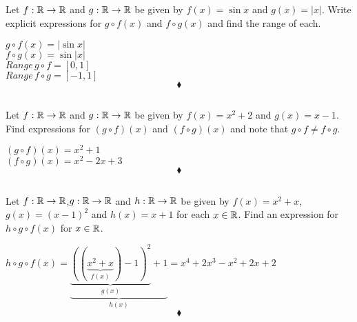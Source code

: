\subsection{}
\begin{tcolorbox}
Let $f:\mathbb{R}\rightarrow\mathbb{R}$ and $g:\mathbb{R}\rightarrow\mathbb{R}$ be given by $f(x)=\sin{x}$ and $g(x)= |x|$. Write explicit expressions for $g\circ f(x)$ and $f\circ g(x)$ and find the range of each.
\end{tcolorbox}
$$ $$ 
$g\circ f(x)= |\sin{x}|$\\
$f\circ g(x)= \sin{|x|}$\\
$Range \,g\circ f= [0,1]$\\
$Range \,f\circ g=[-1,1]$
$$\blacklozenge$$

\subsection{}
\begin{tcolorbox}
Let $f:\mathbb{R}\rightarrow\mathbb{R}$ and $g:\mathbb{R}\rightarrow\mathbb{R}$ be given by $f(x)=x^2+2$ and $g(x)= x-1$. Find expressions for $(g\circ f)(x)$ and $(f\circ g)(x)$ and note that $g\circ f\ne f\circ g$.
\end{tcolorbox}
$$ $$ 
$(g\circ f)(x)=x^2+1$\\
$(f\circ g)(x)= x^2-2x+3$\\
$$\blacklozenge$$
\newpage

\subsection{}
\begin{tcolorbox}
Let $f:\mathbb{R}\rightarrow\mathbb{R}$,$g:\mathbb{R}\rightarrow\mathbb{R}$  and $h:\mathbb{R}\rightarrow\mathbb{R}$ be given by $f(x)=x^2+x$, $g(x)=(x-1)^2$  and $h(x)= x+1$ for each $x\in\mathbb{R}$. Find an expression for $h\circ g\circ f(x)$ for $x\in\mathbb{R}$.
\end{tcolorbox}
$$ $$ 
 $h\circ g\circ f(x)=\underbrace{ \underbrace{\left((\underbrace{x^2+x}_{f(x)})-1\right)^2}_{g(x)}+1}_{h(x)}=x^4+2x^3-x^2+2x+2$
$$\blacklozenge$$


